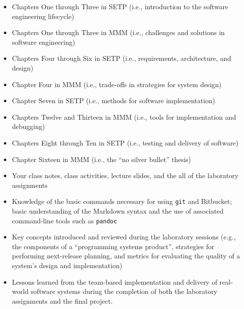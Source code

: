 \begin{itemize}

  \itemsep 0in

  \item Chapters One through Three in SETP (i.e., introduction to the software engineering lifecycle)

  \item Chapters One through Three in MMM (i.e., challenges and solutions in software engineering)

  \item Chapters Four through Six in SETP (i.e., requirements, architecture, and design)

  \item Chapter Four in MMM (i.e., trade-offs in strategies for system design)

  \item Chapter Seven in SETP (i.e., methods for software implementation)

  \item Chapters Twelve and Thirteen in MMM (i.e., tools for implementation and debugging)

  \item Chapters Eight through Ten in SETP (i.e., testing and delivery of software)

  \item Chapter Sixteen in MMM (i.e., the ``no silver bullet'' thesis)

  \item Your class notes, class activities, lecture slides, and the all of the laboratory assignments

  \item Knowledge of the basic commands necessary for using {\tt git} and Bitbucket; basic understanding of the Markdown
    syntax and the use of associated command-line tools such as {\tt pandoc}

  \item Key concepts introduced and reviewed during the laboratory sessions (e.g., the components of a ``programming
    systems product'', strategies for performing next-release planning, and metrics for evaluating the quality of a
    system's design and implementation)

  \item Lessons learned from the team-based implementation and delivery of real-world software systems during the
    completion of both the laboratory assignments and the final project.

\end{itemize}

